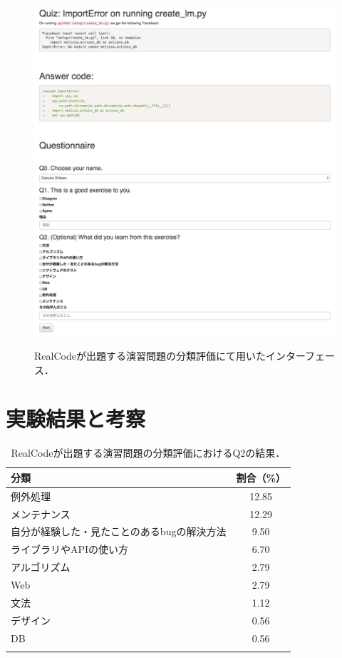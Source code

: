 \begin{figure}[H]
　\centering
  \includegraphics[width=1.0\columnwidth]{20181218-lab-study-interface-all.png}
  \caption{RealCodeが出題する演習問題の分類評価にて用いたインターフェース．}
  \label{fig:lab-study}
\end{figure}

\section{実験結果と考察}

\begin{table}[b]
  \centering
  \caption{RealCodeが出題する演習問題の分類評価におけるQ2の結果．}
  \label{table:lab-study-q2-result}
  \begin{tabular}{ l | c } \Xhline{3\arrayrulewidth}
      分類 & 割合（\%） \\ \hline \hline
      例外処理 & 12.85 \\
      メンテナンス & 12.29  \\
      自分が経験した・見たことのあるbugの解決方法 & 9.50 \\
      ライブラリやAPIの使い方 & 6.70 \\
      アルゴリズム & 2.79 \\
      Web & 2.79 \\
      文法 & 1.12 \\  
      デザイン & 0.56 \\
      DB & 0.56 \\
      \Xhline{3\arrayrulewidth}
  \end{tabular}
\end{table}

